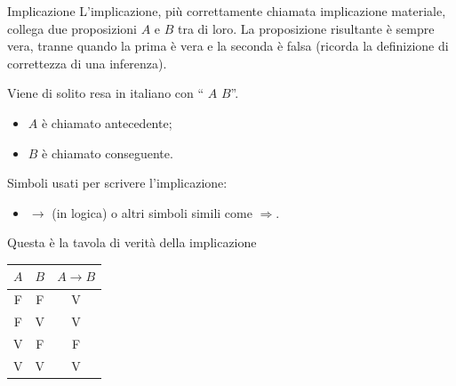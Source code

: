 \documentclass[aspectratio=169,10pt,dvipsnames,handout]{beamer}
\begin{document}
\begin{frame}{Implicazione}
    L'\alert{implicazione}, più correttamente chiamata \alert{implicazione materiale}, collega due proposizioni $A$ e $B$ tra di loro. La proposizione risultante è sempre vera, tranne quando la prima è vera e la seconda è falsa (ricorda la definizione di correttezza di una inferenza).

    \medskip
    Viene di solito resa in italiano con `` $A$  $B$''.
    \begin{itemize}
        \item $A$ è chiamato \alert{antecedente};
        \item $B$ è chiamato \alert{conseguente}.
    \end{itemize}

    \medskip
    Simboli usati per scrivere l'implicazione:
    \begin{itemize}
        \item \alert{$\to$ (in logica)} o altri simboli simili come $\Rightarrow$.
    \end{itemize}

    \pause
    \medskip
    Questa è la tavola di verità della implicazione

    \medskip
    \begin{center}
        \begin{tabular}{c|c||c}
            $A$ & $B$ & $A \to B$ \\
            \hline
            F   & F   & V         \\
            F   & V   & V         \\
            V   & F   & F         \\
            V   & V   & V
        \end{tabular}
    \end{center}
\end{frame}
\end{document}

